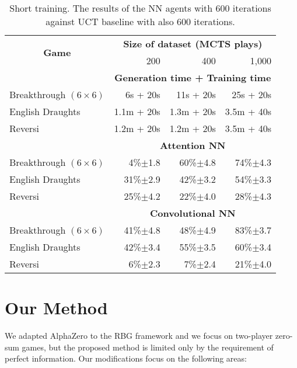 \documentclass[letterpaper]{article}
\begin{document}
\begin{table}[!ht]\small\centering\renewcommand{\arraystretch}{1.1}\setlength\tabcolsep{4.9pt}
\newcommand{\cb}[1]{{\scriptsize $\pm$#1}}%
\begin{adjustbox}{width=0.81\columnwidth}
\begin{tabular}{|l|r|r|r|}\hline
\multicolumn{1}{|c|}{\multirow{2}{*}{\bf Game}} & \multicolumn{3}{c|}{\bf Size of dataset (MCTS plays)} \\
                          & 200 & 400 & 1,000 \\\hline
                          & \multicolumn{3}{c|}{\bf Generation time + Training time} \\
Breakthrough $(6\times6)$ & 6s   + 20s &  11s + 20s & 25s + 20s \\
English Draughts          & 1.1m + 20s & 1.3m + 20s & 3.5m + 40s \\
Reversi                   & 1.2m + 20s & 1.2m + 20s & 3.5m + 40s \\\hline
                          & \multicolumn{3}{c|}{\bf Attention NN} \\
Breakthrough $(6\times6)$ & 4\%\cb{1.8} & 60\%\cb{4.8} & 74\%\cb{4.3} \\
English Draughts          & 31\%\cb{2.9} & 42\%\cb{3.2} & 54\%\cb{3.3} \\
Reversi                   & 25\%\cb{4.2} & 22\%\cb{4.0} & 28\%\cb{4.3} \\\hline
                          & \multicolumn{3}{c|}{\bf Convolutional NN} \\
Breakthrough $(6\times6)$ & 41\%\cb{4.8} & 48\%\cb{4.9} & 83\%\cb{3.7} \\
English Draughts          & 42\%\cb{3.4} & 55\%\cb{3.5} & 60\%\cb{3.4} \\
Reversi                   & 6\%\cb{2.3} & 7\%\cb{2.4} & 21\%\cb{4.0} \\\hline

\end{tabular}
\end{adjustbox}
\caption{Short training. The results of the NN agents with 600 iterations against UCT baseline with also 600 iterations.} \label{tab:fast}
\end{table}

\section{Our Method}

We adapted AlphaZero to the RBG framework and we focus on two-player zero-sum games, but the proposed method is limited only by the requirement of perfect information.
Our modifications focus on the following areas:
\end{document}

